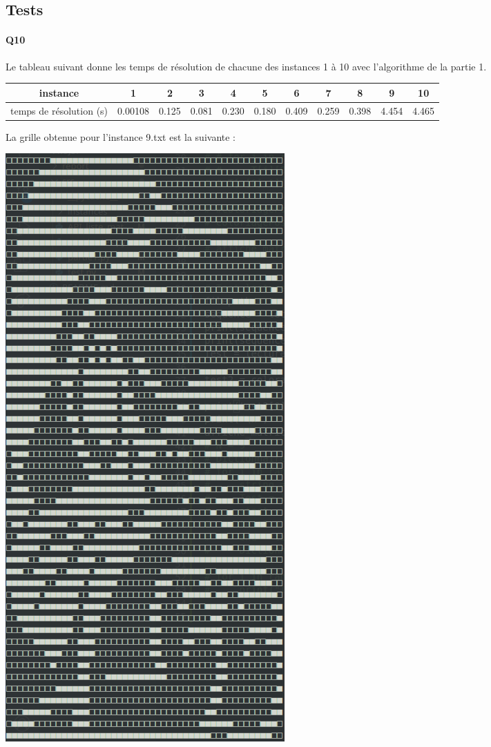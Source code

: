 \documentclass[12pt]{article}
\begin{document}
		\subsection{Tests}
		
			\paragraph{Q10}
				Le tableau suivant donne les temps de résolution de chacune des instances 1 à 10 avec l'algorithme de la partie 1.
				\begin{center}
					\begin{tabular}{|c|c|c|c|c|c|c|c|c|c|c| }
						\hline
						instance & 1 & 2 & 3 & 4 & 5 & 6 & 7 & 8 & 9 & 10 \\ \hline
						temps de résolution (s) & 0.00108 & 0.125 & 0.081 & 0.230 & 0.180 & 0.409 & 0.259 & 0.398 & 4.454 & 4.465 \\ \hline
					\end{tabular}
				\end{center}
				
				La grille obtenue pour l'instance 9.txt est la suivante :
				\begin{center}
				\includegraphics[scale=0.4]{instance9.png}
			\end{center}
		
\end{document}
